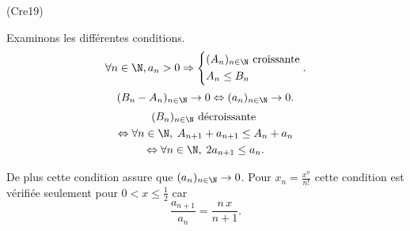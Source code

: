 \begin{tiny}(Cre19)\end{tiny} Examinons les différentes conditions.
\[
  \forall n \in \N, a_n >0 \Rightarrow
  \left\lbrace
  \begin{aligned}
    &(A_n)_{n \in \N} \text{ croissante} \\
    &A_n \leq B_n
  \end{aligned}
  \right. .
\]
\[
  (B_n - A_n)_{n \in \N}\rightarrow 0 \Leftrightarrow (a_n)_{n \in \N}\rightarrow 0.
\]
\begin{multline*}
  (B_n)_{n \in \N} \text{ décroissante }\\
  \Leftrightarrow 
  \forall n \in \N, \; A_{n+1} + a_{n+1} \leq A_n + a_n \\
  \Leftrightarrow 
  \forall n \in \N, \; 2a_{n+1} \leq a_n.  
\end{multline*}

De plus cette condition assure que $(a_n)_{n \in \N}\rightarrow 0$.\newline
Pour $x_n = \frac{x^n}{n!}$ cette condition est vérifiée seulement pour $0 < x \leq \frac{1}{2}$ car
\[
  \frac{a_{n+1}}{a_n} = \frac{n\, x}{n+1}.
\]

